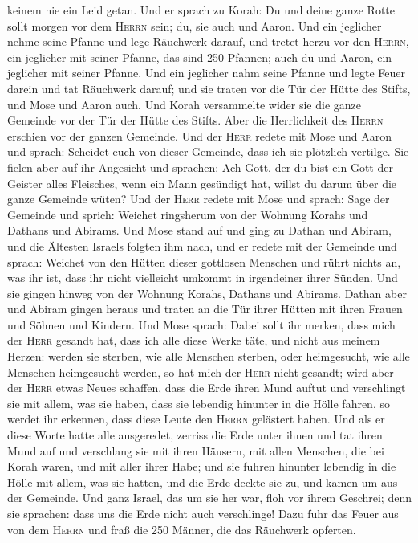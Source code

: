 keinem nie ein Leid getan.  Und er sprach zu Korah: Du
und deine ganze Rotte sollt morgen vor dem \textsc{Herrn} sein; du, sie
auch und Aaron.  Und ein jeglicher nehme seine Pfanne und
lege Räuchwerk darauf, und tretet herzu vor den \textsc{Herrn}, ein
jeglicher mit seiner Pfanne, das sind 250 Pfannen; auch du und Aaron,
ein jeglicher mit seiner Pfanne.  Und ein jeglicher nahm
seine Pfanne und legte Feuer darein und tat Räuchwerk darauf; und sie
traten vor die Tür der Hütte des Stifts, und Mose und Aaron auch.
 Und Korah versammelte wider sie die ganze Gemeinde vor
der Tür der Hütte des Stifts. Aber die Herrlichkeit des \textsc{Herrn}
erschien vor der ganzen Gemeinde.  Und der \textsc{Herr}
redete mit Mose und Aaron und sprach:  Scheidet euch von
dieser Gemeinde, dass ich sie plötzlich vertilge.  Sie
fielen aber auf ihr Angesicht und sprachen: Ach Gott, der du bist ein
Gott der Geister alles Fleisches, wenn ein Mann gesündigt hat, willst du
darum über die ganze Gemeinde wüten?  Und der
\textsc{Herr} redete mit Mose und sprach:  Sage der
Gemeinde und sprich: Weichet ringsherum von der Wohnung Korahs und
Dathans und Abirams.  Und Mose stand auf und ging zu
Dathan und Abiram, und die Ältesten Israels folgten ihm nach,
 und er redete mit der Gemeinde und sprach: Weichet von
den Hütten dieser gottlosen Menschen und rührt nichts an, was ihr ist,
dass ihr nicht vielleicht umkommt in irgendeiner ihrer Sünden.
 Und sie gingen hinweg von der Wohnung Korahs, Dathans
und Abirams. Dathan aber und Abiram gingen heraus und traten an die Tür
ihrer Hütten mit ihren Frauen und Söhnen und Kindern. 
Und Mose sprach: Dabei sollt ihr merken, dass mich der \textsc{Herr}
gesandt hat, dass ich alle diese Werke täte, und nicht aus meinem
Herzen:  werden sie sterben, wie alle Menschen sterben,
oder heimgesucht, wie alle Menschen heimgesucht werden, so hat mich der
\textsc{Herr} nicht gesandt;  wird aber der \textsc{Herr}
etwas Neues schaffen, dass die Erde ihren Mund auftut und verschlingt
sie mit allem, was sie haben, dass sie lebendig hinunter in die Hölle
fahren, so werdet ihr erkennen, dass diese Leute den \textsc{Herrn}
gelästert haben.  Und als er diese Worte hatte alle
ausgeredet, zerriss die Erde unter ihnen  und tat ihren
Mund auf und verschlang sie mit ihren Häusern, mit allen Menschen, die
bei Korah waren, und mit aller ihrer Habe;  und sie
fuhren hinunter lebendig in die Hölle mit allem, was sie hatten, und die
Erde deckte sie zu, und kamen um aus der Gemeinde.  Und
ganz Israel, das um sie her war, floh vor ihrem Geschrei; denn sie
sprachen: dass uns die Erde nicht auch verschlinge!  Dazu
fuhr das Feuer aus von dem \textsc{Herrn} und fraß die 250 Männer, die
das Räuchwerk opferten.

